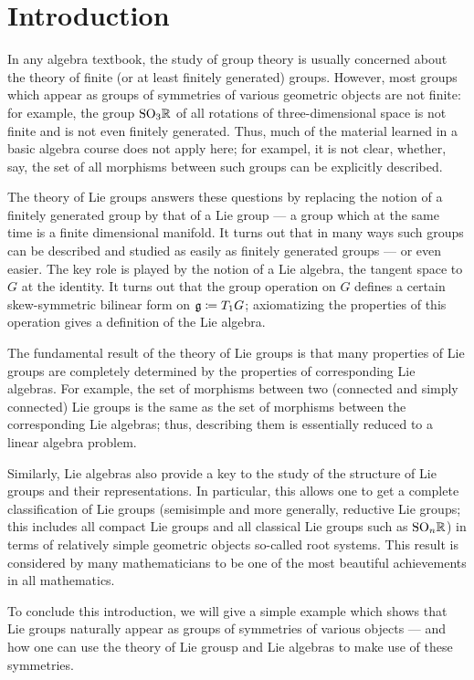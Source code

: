 \chapter{Introduction}
In any algebra textbook, the study of group theory is usually concerned
about the theory of finite (or at least finitely generated)
groups. However, most groups which appear as groups of symmetries of
various geometric objects are not finite: for example, the group
$\mathrm{SO}_3\mathbb{R}$ of all rotations of three-dimensional space is not finite and
is not even finitely generated. Thus, much of the material learned in a
basic algebra course does not apply here; for exampel, it is not clear,
whether, say, the set of all morphisms between such groups can be
explicitly described.

The theory of Lie groups answers these questions by replacing the notion of
a finitely generated group by that of a Lie group --- a group which at the
same time is a finite dimensional manifold. It turns out that in many ways
such groups can be described and studied as easily as finitely generated
groups --- or even easier. The key role is played by the notion of a Lie
algebra, the tangent space to $G$ at the identity. It turns out that the
group operation on $G$ defines a certain skew-symmetric bilinear form on
$\mathfrak{g}\coloneq T_1G$; axiomatizing the properties of this operation gives
a definition of the Lie algebra.

The fundamental result of the theory of Lie groups is that many properties
of Lie groups are completely determined by the properties of corresponding
Lie algebras. For example, the set of morphisms between two (connected and
simply connected) Lie groups is the same as the set of morphisms between
the corresponding Lie algebras; thus, describing them is essentially
reduced to a linear algebra problem.

Similarly, Lie algebras also provide a key to the study of the structure of
Lie groups and their representations. In particular, this allows one to get
a complete classification of Lie groups (semisimple and more generally,
reductive Lie groups; this includes all compact Lie groups and all
classical Lie groups such as $\mathrm{SO}_n\mathbb{R}$) in terms of relatively simple
geometric objects so-called root systems. This result is considered by many
mathematicians to be one of the most beautiful achievements in all
mathematics.

To conclude this introduction, we will give  a simple example which shows
that Lie groups naturally appear as groups of symmetries of various
objects --- and how one can use the theory of Lie grousp and Lie algebras
to make use of these symmetries.

